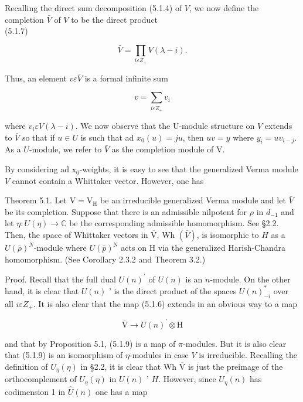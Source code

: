 \documentclass[10pt]{article}
\begin{document}
Recalling the direct sum decomposition (5.1.4) of $V$, we now define the completion $\bar{V}$ of $V$ to be the direct product\\
(5.1.7)

$$
\bar{V}=\prod_{i \varepsilon Z_{+}} V(\lambda-i) .
$$

Thus, an element $v \varepsilon \bar{V}$ is a formal infinite sum


\begin{equation*}
v=\sum_{i \varepsilon Z_{+}} v_{i} \tag{5.1.8}
\end{equation*}


where $v_{i} \varepsilon V(\lambda-i)$. We now observe that the U-module structure on $V$ extends to $\bar{V}$ so that if $u \in U$ is such that ad $x_{0}(u)=j u$, then $u v=y$ where $y_{i}=u v_{i-j}$. As a $U$-module, we refer to $\bar{V}$ as the completion module of V.

By considering ad $\mathrm{x}_{0}$-weights, it is easy to see that the generalized Verma module $V$ cannot contain a Whittaker vector. However, one has

Theorem 5.1. Let $\mathrm{V}=\mathrm{V}_{\mathrm{H}}$ be an irreducible generalized Verma module and let $\bar{V}$ be its completion. Suppose that there is an admissible nilpotent for $\rho$ in $d_{-1}$ and let $\eta: U(\eta) \rightarrow \mathbb{C}$ be the corresponding admissible homomorphism. See §2.2. Then, the space of Whittaker vectors in $\overline{\mathrm{V}}$, Wh $(\bar{V})$, is isomorphic to $H$ as a $U(\bar{\rho})^{N}$-module where $U(\bar{p})^{\mathrm{N}}$ acts on H via the generalized Harish-Chandra homomorphism. (See Corollary 2.3.2 and Theorem 3.2.)

Proof. Recall that the full dual $U(n)^{\prime}$ of $U(n)$ is an $n$-module. On the other hand, it is clear that $U(n)$ ' is the direct product of the spaces $U(n)_{-i}^{*}$ over\\
all $i \varepsilon Z_{+}$. It is also clear that the map (5.1.6) extends in an obvious way to a map


\begin{equation*}
\overline{\mathrm{V}} \rightarrow U(n)^{\prime} \otimes \mathrm{H} \tag{5.1.9}
\end{equation*}


and that by Proposition 5.1, (5.1.9) is a map of $\pi$-modules. But it is also clear that (5.1.9) is an isomorphism of $\eta$-modules in case $V$ is irreducible. Recalling the definition of $U_{\eta}(\eta)$ in §2.2, it is clear that Wh $\overline{\mathrm{V}}$ is just the preimage of the orthocomplement of $U_{\eta}(\eta)$ in $U(n)$ ' $H$. However, since $U_{\eta}(n)$ has codimension 1 in $\hat{U}(n)$ one has a map
\end{document}
